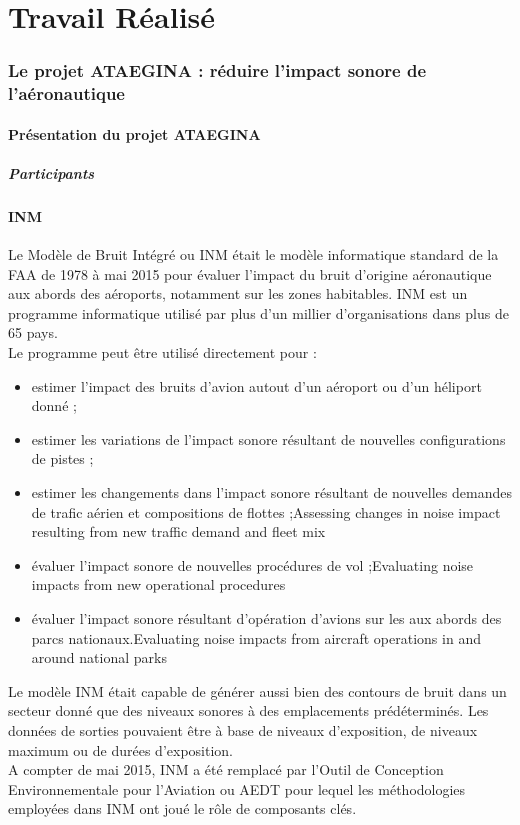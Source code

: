 \documentclass[a4paper,12pt,twoside]{article}
\begin{document}
    \part{Travail Réalisé}

    \section{Le projet ATAEGINA : réduire l'impact sonore de l'aéronautique}
    \subsection{Présentation du projet ATAEGINA}
    \subsubsection{Participants}
    \subsection{\gls{INM}}
    Le Modèle de Bruit Intégré ou \gls{INM} était le modèle  informatique standard de la \gls{FAA} de 1978 à mai 2015 pour évaluer l'impact du bruit d'origine aéronautique aux abords des aéroports, notamment sur les zones habitables. \gls{INM} est un programme informatique utilisé par plus d'un millier d'organisations dans plus de 65 pays.\\
    Le programme peut être utilisé directement pour :
    \begin{itemize}
    	\item estimer l'impact des bruits d'avion autout d'un aéroport ou d'un héliport donné ;
    	\item estimer les variations de l'impact sonore résultant de nouvelles configurations de pistes ;
    	\item estimer les changements dans l'impact sonore résultant de nouvelles demandes de trafic aérien et compositions de flottes ;Assessing changes in noise impact resulting from new traffic demand and fleet mix
    	\item évaluer l'impact sonore de nouvelles procédures de vol ;Evaluating noise impacts from new operational procedures
    	\item évaluer l'impact sonore résultant d'opération d'avions sur les aux abords des parcs nationaux.Evaluating noise impacts from aircraft operations in and around national parks
    \end{itemize}
    Le modèle \gls{INM} était capable de générer aussi bien des contours de bruit dans un secteur donné que des niveaux sonores à des emplacements prédéterminés. Les données de sorties pouvaient être à base de niveaux d'exposition, de niveaux maximum ou de durées d'exposition.\\
    A compter de mai 2015, \gls{INM} a été remplacé par l'Outil de Conception Environnementale pour l'Aviation ou \gls{AEDT} pour lequel les méthodologies employées dans INM ont joué le rôle de composants clés.
\end{document}
